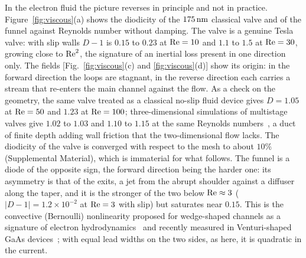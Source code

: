 In the electron fluid the picture reverses in principle and not in practice.
Figure~\ref{fig:viscous}(a) shows the diodicity of the $175\,\mathrm{nm}$ classical
valve and of the funnel against Reynolds number without damping. The valve is
a genuine Tesla valve: with slip walls $D-1$ is $0.15$ to $0.23$ at $\mathrm{Re}=10$
and $1.1$ to $1.5$ at $\mathrm{Re}=30$, growing close to $\mathrm{Re}^{2}$, the signature of
an inertial loss present in one direction only. The fields
[Fig.~\ref{fig:viscous}(c) and \ref{fig:viscous}(d)] show its origin: in the
forward direction the loops are stagnant, in the reverse direction each
carries a stream that re-enters the main channel against the flow. As a
check on the geometry, the same valve treated as a classical no-slip fluid
device gives $D=1.05$ at $\mathrm{Re}=50$ and $1.23$ at $\mathrm{Re}=100$;
three-dimensional simulations of multistage valves give $1.02$ to $1.03$
and $1.10$ to $1.15$ at the same Reynolds
numbers~\cite{liosis2025diodicity}, a duct of finite depth adding wall
friction that the two-dimensional flow lacks. The diodicity of the valve is
converged with respect to the mesh to about $10\%$ (Supplemental
Material), which is immaterial for what follows. The funnel is a diode of the
opposite sign, the forward direction being the harder one: its asymmetry is
that of the exits, a jet from the abrupt shoulder against a diffuser along
the taper, and it is the stronger of the two below $\mathrm{Re}\approx3$
($|D-1|=1.2\times10^{-2}$ at $\mathrm{Re}=3$ with slip) but saturates near $0.15$.
This is the convective (Bernoulli) nonlinearity proposed for wedge-shaped
channels as a signature of electron
hydrodynamics~\cite{hui2021beyond} and recently measured in Venturi-shaped
GaAs devices~\cite{monari2026electron}; with equal lead widths on the two
sides, as here, it is quadratic in the current.

